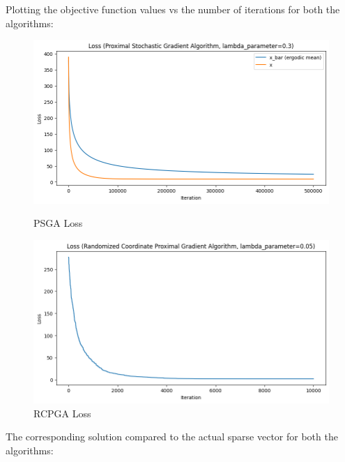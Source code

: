 \documentclass[12pt]{article}
\begin{document}
Plotting the objective function values vs the number of iterations for both the algorithms:

\begin{figure}[h]
\centering
\begin{minipage}{.5\textwidth}
  \centering
\includegraphics[scale=0.3]{outputs/part_3/psga-loss}
\caption{PSGA Loss}
\label{fig:}
\end{minipage}%
\begin{minipage}{.5\textwidth}
  \centering
\includegraphics[scale=0.3]{outputs/part_3/rcpga-loss}
\caption{RCPGA Loss}
\label{fig:}
\end{minipage}
\end{figure}


The corresponding solution compared to the actual sparse vector for both the algorithms:
\end{document}
